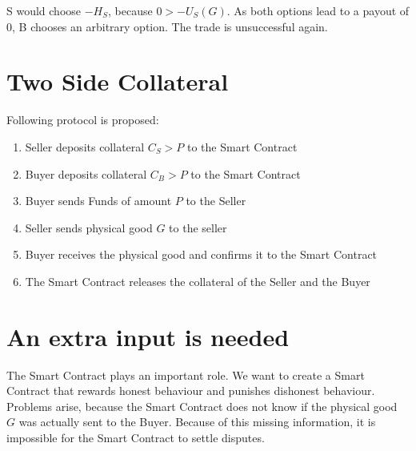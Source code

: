\documentclass{cacthesis}
\begin{document}
S would choose $-H_S$, because $0>-U_S(G)$.\newline
As both options lead to a payout of 0, B chooses an arbitrary option. The trade is unsuccessful again.


\section{Two Side Collateral}
Following protocol is proposed:
\begin{enumerate}
    \item Seller deposits collateral $C_S > P$ to the Smart Contract
    \item Buyer deposits collateral $C_B > P$ to the Smart Contract
    \item Buyer sends Funds of amount $P$ to the Seller
    \item Seller sends physical good $G$ to the seller 
    \item Buyer receives the physical good and confirms it to the Smart Contract
    \item The Smart Contract releases the collateral of the Seller and the Buyer
\end{enumerate}




\section{An extra input is needed}
The Smart Contract plays an important role. We want to create a Smart Contract that rewards honest behaviour and punishes dishonest behaviour.\newline
Problems arise, because the Smart Contract does not know if the physical good $G$ was actually sent to the Buyer. Because of this missing information, it is impossible for the Smart Contract to settle disputes.
\end{document}
